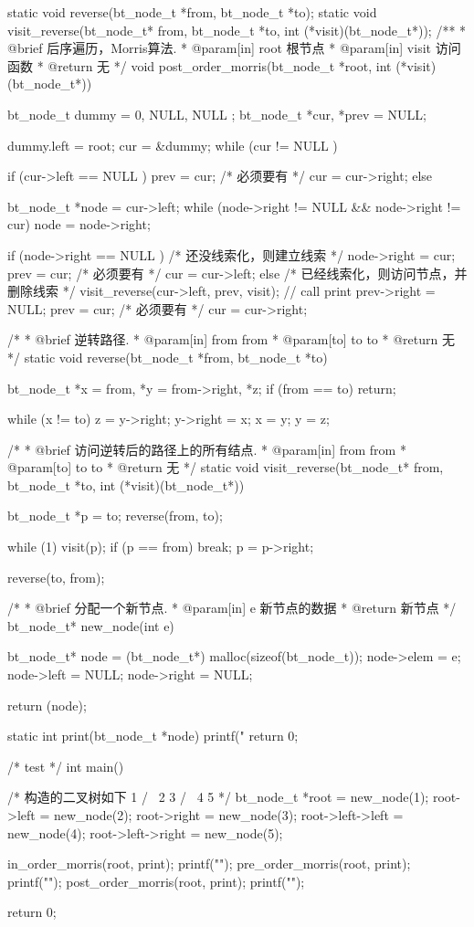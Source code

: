 \begin{Codex}[label=morris_traversal.c]
static void reverse(bt_node_t *from, bt_node_t *to);
static void visit_reverse(bt_node_t* from, bt_node_t *to,
        int (*visit)(bt_node_t*));
/**
 * @brief 后序遍历，Morris算法.
 * @param[in] root 根节点
 * @param[in] visit 访问函数
 * @return 无
 */
void post_order_morris(bt_node_t *root, int (*visit)(bt_node_t*)) {
    bt_node_t dummy = { 0, NULL, NULL };
    bt_node_t *cur, *prev = NULL;

    dummy.left = root;
    cur = &dummy;
    while (cur != NULL ) {
        if (cur->left == NULL ) {
            prev = cur; /* 必须要有 */
            cur = cur->right;
        } else {
            bt_node_t *node = cur->left;
            while (node->right != NULL && node->right != cur)
                node = node->right;

            if (node->right == NULL ) { /* 还没线索化，则建立线索 */
                node->right = cur;
                prev = cur; /* 必须要有 */
                cur = cur->left;
            } else { /* 已经线索化，则访问节点，并删除线索  */
                visit_reverse(cur->left, prev, visit);  // call print
                prev->right = NULL;
                prev = cur; /* 必须要有 */
                cur = cur->right;
            }
        }
    }
}

/*
 * @brief 逆转路径.
 * @param[in] from from
 * @param[to] to to
 * @return 无
 */
static void reverse(bt_node_t *from, bt_node_t *to) {
    bt_node_t *x = from, *y = from->right, *z;
    if (from == to) return;

    while (x != to) {
        z = y->right;
        y->right = x;
        x = y;
        y = z;
    }
}

/*
 * @brief  访问逆转后的路径上的所有结点.
 * @param[in] from from
 * @param[to] to to
 * @return 无
 */
static void visit_reverse(bt_node_t* from, bt_node_t *to,
        int (*visit)(bt_node_t*)) {
    bt_node_t *p = to;
    reverse(from, to);

    while (1) {
        visit(p);
        if (p == from)
            break;
        p = p->right;
    }

    reverse(to, from);
}

/*
 * @brief 分配一个新节点.
 * @param[in] e 新节点的数据
 * @return 新节点
 */
bt_node_t* new_node(int e) {
    bt_node_t* node = (bt_node_t*) malloc(sizeof(bt_node_t));
    node->elem = e;
    node->left = NULL;
    node->right = NULL;

    return (node);
}

static int print(bt_node_t *node) {
    printf(" %
    return 0;
}

/* test */
int main() {
    /* 构造的二叉树如下
       1
     /   \
    2      3
  /  \
4     5
     */
    bt_node_t *root = new_node(1);
    root->left = new_node(2);
    root->right = new_node(3);
    root->left->left = new_node(4);
    root->left->right = new_node(5);

    in_order_morris(root, print);
    printf("\n");
    pre_order_morris(root, print);
    printf("\n");
    post_order_morris(root, print);
    printf("\n");

    return 0;
}
\end{Codex}


